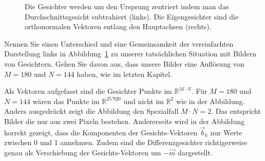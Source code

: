 \begin{figure}[ht]
\begin{minipage}{0.5\textwidth}
	\end{minipage}
	\caption{Die Gesichter werden um den Ursprung zentriert indem man das Durchschnittsgesicht subtrahiert (links).
	Die Eigengesichter sind die orthonormalen Vektoren entlang den Hauptachsen (rechts).}
	\label{fig:meandiff}
\end{figure}
\begin{aufgabe}
	Nennen Sie einen Unterschied und eine Gemeinsamkeit der vereinfachten Darstellung links in Abbildung~\ref{fig:meandiff} zu unserer tatsächlichen Situation mit Bildern von Gesichtern.
	Gehen Sie davon aus, dass unsere Bilder eine Auflösung von $M=180$ und $N=144$ haben, wie im letzten Kapitel.
\end{aufgabe}
\begin{losung*}
	Als Vektoren aufgefasst sind die Gesichter Punkte im $\mathbb R^{M\cdot N}$.
	Für $M=180$ und $N=144$ wären das Punkte im $\mathbb R^{25'920}$ und nicht im $\mathbb R^2$ wie in der Abbildung.
	Anders ausgedrückt zeigt die Abbildung den Spezialfall $M\cdot N=2$.
	Das entspricht Bilder die nur aus zwei Pixeln bestehen.
	Andererseits wird in der Abbildung korrekt gezeigt, dass die Komponenten der Gesichts-Vektoren $\vec b_k$ nur Werte zwischen 0 und 1 annehmen.
	Zudem sind die Differenzgesichter richtigerweise genau als Verschiebung der Gesichts-Vektoren um $-\vec m$ dargestellt.
\end{losung*}

